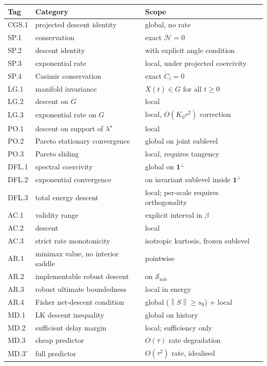 \documentclass[11pt,a4paper]{article}
\theoremstyle{definition}
\newcommand{\norm}[1]{\left\|#1\right\|}
\newcommand{\rob}{\mathrm{rob}}
\begin{document}
\begin{center}
\renewcommand{\arraystretch}{1.2}
\begin{tabularx}{\textwidth}{l l X}
\toprule
\textbf{Tag} & \textbf{Category} & \textbf{Scope} \\
\midrule
CGS.1 & projected descent identity & global, no rate \\
SP.1 & conservation & exact $\dot{\mathcal{H}} = 0$ \\
SP.2 & descent identity & with explicit angle condition \\
SP.3 & exponential rate & local, under projected coercivity \\
SP.4 & Casimir conservation & exact $\dot C_i = 0$ \\
LG.1 & manifold invariance & $X(t) \in G$ for all $t \geq 0$ \\
LG.2 & descent on $G$ & local \\
LG.3 & exponential rate on $G$ & local, $O(K_0 r^2)$ correction \\
PO.1 & descent on support of $\lambda^\star$ & local \\
PO.2 & Pareto stationary convergence & global on joint sublevel \\
PO.3 & Pareto sliding & local, requires tangency \\
DFL.1 & spectral coercivity & global on $\mathbf{1}^\perp$ \\
DFL.2 & exponential convergence & on invariant sublevel inside $\mathbf{1}^\perp$ \\
DFL.3 & total energy descent & local; per-scale requires orthogonality \\
AC.1 & validity range & explicit interval in $\beta$ \\
AC.2 & descent & local \\
AC.3 & strict rate monotonicity & isotropic kurtosis, frozen sublevel \\
AR.1 & minimax value, no interior saddle & pointwise \\
AR.2 & implementable robust descent & on $\mathcal{S}_\rob$ \\
AR.3 & robust ultimate boundedness & local in energy \\
AR.4 & Fisher net-descent condition & global ($\norm{S} \geq s_0$) + local \\
MD.1 & LK descent inequality & global on history \\
MD.2 & sufficient delay margin & local; sufficiency only \\
MD.3 & cheap predictor & $O(\tau)$ rate degradation \\
MD.3$'$ & full predictor & $O(\tau^2)$ rate, idealised \\
\bottomrule
\end{tabularx}
\end{center}
\end{document}
